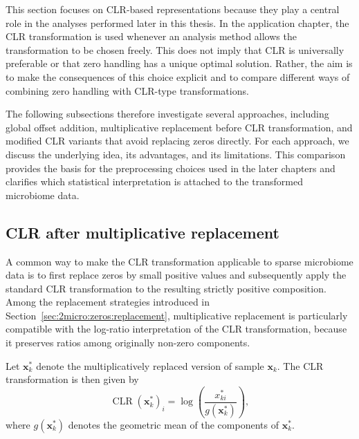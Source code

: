 This section focuses on CLR-based representations because they play a central role in the analyses performed later in this thesis. In the application chapter, the CLR transformation is used whenever an analysis method allows the transformation to be chosen freely. This does not imply that CLR is universally preferable or that zero handling has a unique optimal solution. Rather, the aim is to make the consequences of this choice explicit and to compare different ways of combining zero handling with CLR-type transformations.

The following subsections therefore investigate several approaches, including global offset addition, multiplicative replacement before CLR transformation, and modified CLR variants that avoid replacing zeros directly. For each approach, we discuss the underlying idea, its advantages, and its limitations. This comparison provides the basis for the preprocessing choices used in the later chapters and clarifies which statistical interpretation is attached to the transformed microbiome data.

\subsection{CLR after multiplicative replacement} 
\label{sec:2micro:clr_with_zeros:multRepl}

A common way to make the CLR transformation applicable to sparse microbiome data is to first replace zeros by small positive values and subsequently apply the standard CLR transformation to the resulting strictly positive composition. Among the replacement strategies introduced in Section~\ref{sec:2micro:zeros:replacement}, multiplicative replacement is particularly compatible with the log-ratio interpretation of the CLR transformation, because it preserves ratios among originally non-zero components.

Let $\mathbf{x}_k^\ast$ denote the multiplicatively replaced version of sample $\mathbf{x}_k$. The CLR transformation is then given by
\begin{equation}
\operatorname{CLR}(\mathbf{x}_k^\ast)_i=\log\left(\frac{x_{ki}^\ast}{g(\mathbf{x}_k^\ast)}\right),
\label{eq:2micro:clr_after_mult_replacement}
\end{equation}
where $g(\mathbf{x}_k^\ast)$ denotes the geometric mean of the components of $\mathbf{x}_k^\ast$.

